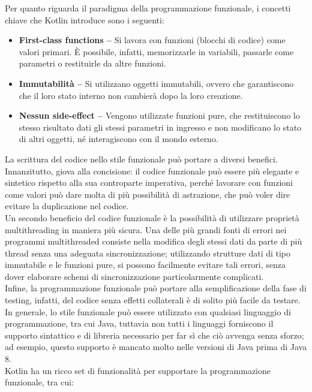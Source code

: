 Per quanto riguarda il paradigma della programmazione funzionale, i concetti chiave che Kotlin introduce sono i seguenti:
\begin{itemize}
  \item {\bfseries First-class functions –} Si lavora con funzioni (blocchi di codice) come valori primari.
        È possibile, infatti, memorizzarle in variabili, passarle come parametri o restituirle da altre funzioni.
  \item {\bfseries Immutabilità –} Si utilizzano oggetti immutabili, ovvero che garantiscono che il loro stato
        interno non cambierà dopo la loro creazione.
  \item {\bfseries Nessun side-effect –} Vengono utilizzate funzioni pure, che restituiscono
        lo stesso risultato dati gli stessi parametri in ingresso e non modificano lo stato di altri oggetti,
        né interagiscono con il mondo esterno.
\end{itemize}
La scrittura del codice nello stile funzionale può portare a diversi benefici.\\
Innanzitutto, giova alla concisione: il codice funzionale può essere più elegante
e sintetico rispetto alla sua controparte imperativa, perché lavorare con funzioni come valori può dare molta di più possibilità di astrazione, che può voler dire evitare la duplicazione nel codice. \\
Un secondo beneficio del codice funzionale è la possibilità di utilizzare proprietà multithreading
in maniera più sicura. Una delle più grandi fonti di errori nei programmi multithreaded consiste
nella modifica degli stessi dati da parte di più thread senza una adeguata sincronizzazione;
utilizzando strutture dati di tipo immutabile e le funzioni pure, si possono facilmente evitare tali errori,
senza dover elaborare schemi di sincronizzazione particolarmente complicati. \\
Infine, la programmazione funzionale può portare alla semplificazione della fase di testing,
infatti, del codice senza effetti collaterali è di solito più facile da testare. \\
In generale, lo stile funzionale può essere utilizzato con qualsiasi linguaggio di programmazione,
tra cui Java, tuttavia non tutti i linguaggi forniscono il supporto sintattico e di libreria
necessario per far sì che ciò avvenga senza sforzo; ad esempio, questo supporto è mancato molto
nelle versioni di Java prima di Java 8. \\
Kotlin ha un ricco set di funzionalità per supportare la programmazione funzionale, tra cui:

